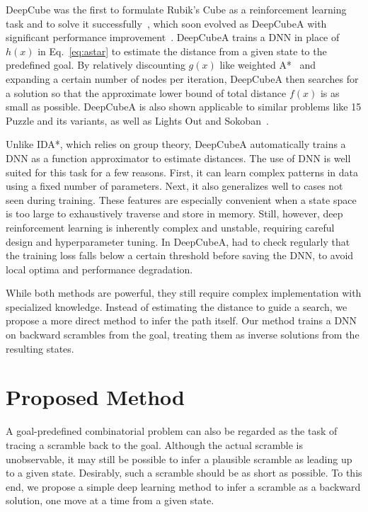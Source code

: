 \documentclass[nohyperref]{article}
\theoremstyle{plain}
\theoremstyle{definition}
\theoremstyle{remark}
\begin{document}
DeepCube was the first to formulate Rubik's Cube as a reinforcement learning task and to solve it successfully~\citep{mcaleer2018solving}, which soon evolved as DeepCubeA with significant performance improvement~\citep{agostinelli2019solving}.
DeepCubeA trains a DNN in place of $h(x)$ in Eq.~\ref{eq:astar} to estimate the distance from a given state to the predefined goal.
By relatively discounting $g(x)$ like weighted A*~\citep{pohl1970heuristic, ebendt2009weighted} and expanding a certain number of nodes per iteration, DeepCubeA then searches for a solution so that the approximate lower bound of total distance $f(x)$ is as small as possible.
DeepCubeA is also shown applicable to similar problems like 15 Puzzle and its variants, as well as Lights Out and Sokoban~\citep{agostinelli2019solving}.

Unlike IDA*, which relies on group theory, DeepCubeA automatically trains a DNN as a function approximator to estimate distances.
The use of DNN is well suited for this task for a few reasons.
First, it can learn complex patterns in data using a fixed number of parameters.
Next, it also generalizes well to cases not seen during training.
These features are especially convenient when a state space is too large to exhaustively traverse and store in memory.
Still, however, deep reinforcement learning is inherently complex and unstable, requiring careful design and hyperparameter tuning.
In DeepCubeA, \citet{agostinelli2019solving} had to check regularly that the training loss falls below a certain threshold before saving the DNN, to avoid local optima and performance degradation.

While both methods are powerful, they still require complex implementation with specialized knowledge.
Instead of estimating the distance to guide a search, we propose a more direct method to infer the path itself.
Our method trains a DNN on backward scrambles from the goal, treating them as inverse solutions from the resulting states.

\vspace{-1.2mm}
\section{Proposed Method}
A goal-predefined combinatorial problem can also be regarded as the task of tracing a scramble back to the goal.
Although the actual scramble is unobservable, it may still be possible to infer a plausible scramble as leading up to a given state.
Desirably, such a scramble should be as short as possible.
To this end, we propose a simple deep learning method to infer a scramble as a backward solution, one move at a time from a given state.
\end{document}
